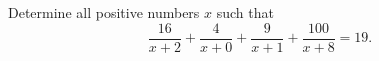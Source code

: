 Determine all positive numbers $x$ such that \[\frac{16}{x+2}+\frac{4}{x+0}+\frac{9}{x+1}+\frac{100}{x+8}=19.\]